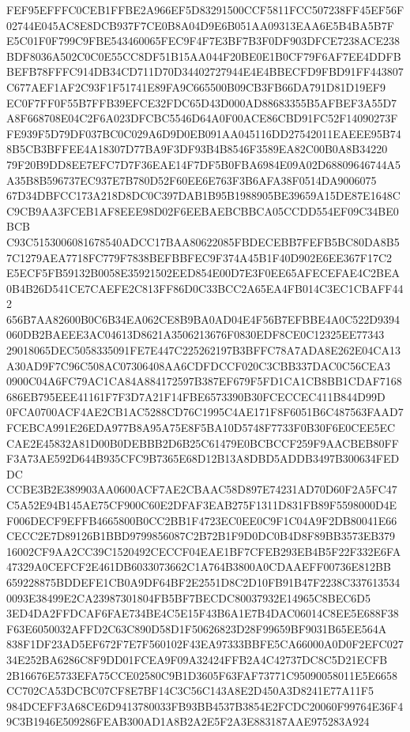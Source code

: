 \documentclass[UTF8,fontset=fandol,zihao=-4,a4paper]{ctexart}
\begin{document}
{{FEF95EFFFC0CEB1FFBE2A966EF5D83291500CCF5811FCC507238FF45EF56F02744E045AC8E8DCB937F7CE0B8A04D9E6B051AA09313EAA6E5B4BA5B7F
E5C01F0F799C9FBE543460065FEC9F4F7E3BF7B3F0DF903DFCE7238ACE238BDF8036A502C0C0E55CC8DF51B15AA044F20BE0E1B0CF79F6AF7EE4DDFB
BEFB78FFFC914DB34CD711D70D34402727944E4E4BBECFD9FBD91FF443807C677AEF1AF2C93F1F51741E89FA9C665500B09CB3FB66DA791D81D19EF9
EC0F7FF0F55B7FFB39EFCE32FDC65D43D000AD88683355B5AFBEF3A55D7A8F668708E04C2F6A023DFCBC5546D64A0F00ACE86CBD91FC52F14090273F
FE939F5D79DF037BC0C029A6D9D0EB091AA045116DD27542011EAEEE95B748B5CB3BFFEE4A18307D77BA9F3DF93B4B8546F3589EA82C00B0A8B34220
79F20B9DD8EE7EFC7D7F36EAE14F7DF5B0FBA6984E09A02D68809646744A5A35B8B596737EC937E7B780D52F60EE6E763F3B6AFA38F0514DA9006075
67D34DBFCC173A218D8DC0C397DAB1B95B1988905BE39659A15DE87E1648CC9CB9AA3FCEB1AF8EEE98D02F6EEBAEBCBBCA05CCDD554EF09C34BE0BCB
C93C5153006081678540ADCC17BAA80622085FBDECEBB7FEFB5BC80DA8B57C1279AEA7718FC779F7838BEFBBFEC9F374A45B1F40D902E6EE367F17C2
E5ECF5FB59132B0058E35921502EED854E00D7E3F0EE65AFECEFAE4C2BEA0B4B26D541CE7CAEFE2C813FF86D0C33BCC2A65EA4FB014C3EC1CBAFF442
656B7AA82600B0C6B34EA062CE8B9BA0AD04E4F56B7EFBBE4A0C522D9394060DB2BAEEE3AC04613D8621A3506213676F0830EDF8CE0C12325EE77343
29018065DEC5058335091FE7E447C225262197B3BFFC78A7ADA8E262E04CA13A30AD9F7C96C508AC07306408AA6CDFDCCF020C3CBB337DAC0C56CEA3
0900C04A6FC79AC1CA84A884172597B387EF679F5FD1CA1CB8BB1CDAF7168686EB795EEE41161F7F3D7A21F14FBE6573390B30FCECCEC411B844D99D
0FCA0700ACF4AE2CB1AC5288CD76C1995C4AE171F8F6051B6C487563FAAD7FCEBCA991E26EDA977B8A95A75E8F5BA10D5748F7733F0B30F6E0CEE5EC
CAE2E45832A81D00B0DEBBB2D6B25C61479E0BCBCCF259F9AACBEB80FFF3A73AE592D644B935CFC9B7365E68D12B13A8DBD5ADDB3497B300634FEDDC
CCBE3B2E389903AA0600ACF7AE2CBAAC58D897E74231AD70D60F2A5FC47C5A52E94B145AE75CF900C60E2DFAF3EAB275F1311D831FB89F5598000D4E
F006DECF9EFFB4665800B0CC2BB1F4723EC0EE0C9F1C04A9F2DB80041E66CECC2E7D89126B1BBD9799856087C2B72B1F9D0DC0B4D8F89BB3573EB379
16002CF9AA2CC39C1520492CECCF04EAE1BF7CFEB293EB4B5F22F332E6FA47329A0CEFCF2E461DB6033073662C1A764B3800A0CDAAEFF00736E812BB
659228875BDDEFE1CB0A9DF64BF2E2551D8C2D10FB91B47F2238C3376135340093E38499E2CA23987301804FB5BF7BECDC80037932E14965C8BEC6D5
3ED4DA2FFDCAF6FAE734BE4C5E15F43B6A1E7B4DAC06014C8EE5E688F38F63E6050032AFFD2C63C890D58D1F50626823D28F99659BF9031B65EE564A
838F1DF23AD5EF672F7E7F560102F43EA97333BBFE5CA66000A0D0F2EFC02734E252BA6286C8F9DD01FCEA9F09A32424FFB2A4C42737DC8C5D21ECFB
2B16676E5733EFA75CCE02580C9B1D3605F63FAF73771C95090058011E5E6658CC702CA53DCBC07CF8E7BF14C3C56C143A8E2D450A3D8241E77A11F5
984DCEFF3A68CE6D9413780033FB93BB4537B3854E2FCDC20060F99764E36F49C3B1946E509286FEAB300AD1A8B2A2E5F2A3E883187AAE975283A924
}}
\end{document}
